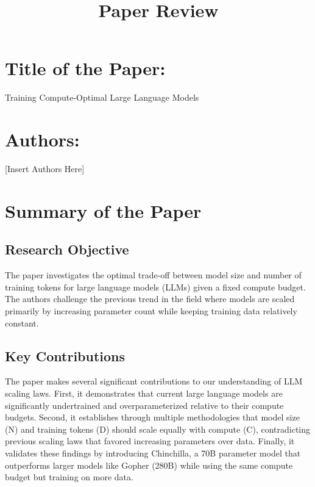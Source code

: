 \documentclass{article}
\title{\textbf{Paper Review}}
\author{}
\date{}
\begin{document}
\justifying

\maketitle

\section*{Title of the Paper:}
Training Compute-Optimal Large Language Models

\section*{Authors:}
[Insert Authors Here]
\section{Summary of the Paper}

\subsection{Research Objective}
The paper investigates the optimal trade-off between model size and number of training tokens for large language models (LLMs) given a fixed compute budget. The authors challenge the previous trend in the field where models are scaled primarily by increasing parameter count while keeping training data relatively constant.

\subsection{Key Contributions}
The paper makes several significant contributions to our understanding of LLM scaling laws. First, it demonstrates that current large language models are significantly undertrained and overparameterized relative to their compute budgets. Second, it establishes through multiple methodologies that model size (N) and training tokens (D) should scale equally with compute (C), contradicting previous scaling laws that favored increasing parameters over data. Finally, it validates these findings by introducing Chinchilla, a 70B parameter model that outperforms larger models like Gopher (280B) while using the same compute budget but training on more data.
\end{document}
